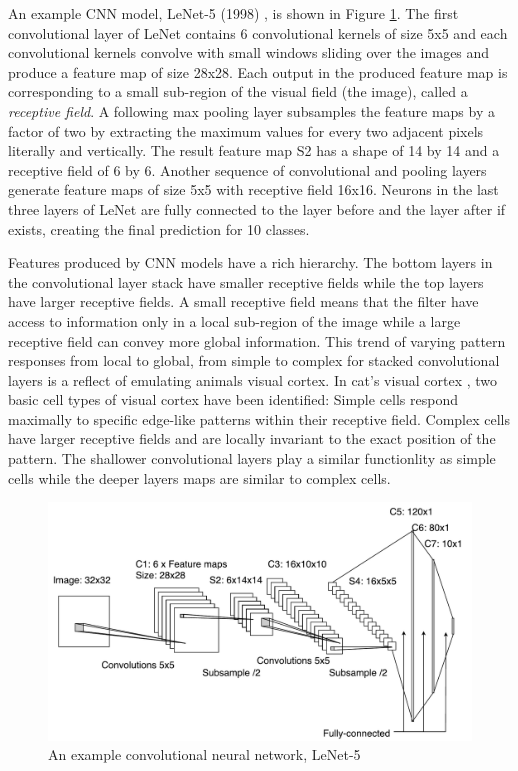 
An example CNN model, LeNet-5 (1998) \cite{lecun1998gradient}, is shown in Figure \ref{fig:lenet}.
The first convolutional layer of LeNet contains 6 convolutional kernels of size 5x5 and each convolutional kernels convolve with small windows sliding over the images and produce a feature map of size 28x28.
Each output in the produced feature map is corresponding to a small sub-region of the visual field (the image), called a \textit{receptive field}.
A following max pooling layer subsamples the feature maps by a factor of two by extracting the maximum values for every two adjacent pixels literally and vertically.
The result feature map S2 has a shape of 14 by 14 and a receptive field of 6 by 6.
Another sequence of convolutional and pooling layers generate feature maps of size 5x5 with receptive field 16x16.
Neurons in the last three layers of LeNet are fully connected to the layer before and the layer after if exists, creating the final prediction for 10 classes.

Features produced by CNN models have a rich hierarchy.
The bottom layers in the convolutional layer stack have smaller receptive fields while the top layers have larger receptive fields.
A small receptive field means that the filter have access to information only in a local sub-region of the image while a large receptive field can convey more global information.
This trend of varying pattern responses from local to global, from simple to complex for stacked convolutional layers is a reflect of emulating animals visual cortex.
In cat's visual cortex \cite{hubel1962receptive}, two basic cell types of visual cortex have been identified:
Simple cells respond maximally to specific edge-like patterns within their receptive field.
Complex cells have larger receptive fields and are locally invariant to the exact position of the pattern.
The shallower convolutional layers play a similar functionlity as simple cells while the deeper layers maps are similar to complex cells.

\begin{figure}[t]
\centering
   \includegraphics[width=\linewidth]{img/lenet}
\caption{An example convolutional neural network, LeNet-5 \cite{lecun1998gradient}}
\label{fig:lenet}
\end{figure}

